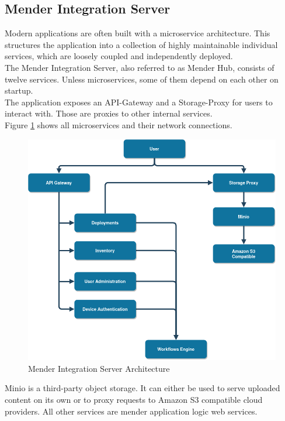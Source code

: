 \subsection{Mender Integration Server}
Modern applications are often built with a microservice architecture. This structures the application into a collection of highly maintainable individual services, which are loosely coupled and independently deployed.\cite{microservicesio}\\
The Mender Integration Server, also referred to as Mender Hub, consists of twelve services. Unless microservices, some of them depend on each other on startup.\\
The application exposes an API-Gateway and a Storage-Proxy for users to interact with. Those are proxies to other internal services.\cite{mender-github}\\
Figure \ref{fig:mender-integration} shows all microservices and their network connections.
\begin{figure}
    \centering
    \includegraphics[scale=0.5]{images/integration-app.png}
    \caption{Mender Integration Server Architecture}
    \label{fig:mender-integration}
\end{figure}
Minio is a third-party object storage. It can either be used to serve uploaded content on its own or to proxy requests to Amazon S3 compatible cloud providers. All other services are mender application logic web services.
\newpage

